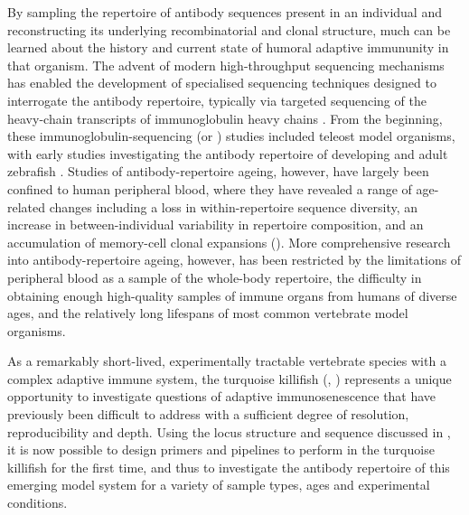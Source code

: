 By sampling the repertoire of antibody sequences present in an individual and reconstructing its underlying recombinatorial and clonal structure, much can be learned about the history and current state of humoral adaptive immununity in that organism.
The advent of modern high-throughput sequencing mechanisms has enabled the development of specialised sequencing techniques designed to interrogate the antibody repertoire, typically via targeted sequencing of the heavy-chain transcripts of immunoglobulin heavy chains \parencite{vollmers2013consensus,turchaninova2016igprep}. From the beginning, these immunoglobulin-sequencing (or \igseq) studies included teleost model organisms, with early \igseq studies investigating the antibody repertoire of developing and adult zebrafish \parencite{weinstein2009igseq,jiang2011determinism}. Studies of antibody-repertoire ageing, however, have largely been confined to human peripheral blood, where they have revealed a range of age-related changes including a loss in within-repertoire sequence diversity, an increase in between-individual variability in repertoire composition, and an accumulation of memory-cell clonal expansions (). More comprehensive research into antibody-repertoire ageing, however, has been restricted by the limitations of peripheral blood as a sample of the whole-body repertoire, the difficulty in obtaining enough high-quality samples of immune organs from humans of diverse ages, and the relatively long lifespans of most common vertebrate model organisms. 

As a remarkably short-lived, experimentally tractable vertebrate species with a complex adaptive immune system, the turquoise killifish (\nfu, ) represents a unique opportunity to investigate questions of adaptive immunosenescence that have previously been difficult to address with a sufficient degree of resolution, reproducibility and depth. Using the \igh{} locus structure and sequence discussed in , it is now possible to design primers and pipelines to perform \igseq in the turquoise killifish for the first time, and thus to investigate the antibody repertoire of this emerging model system for a variety of sample types, ages and experimental conditions.


